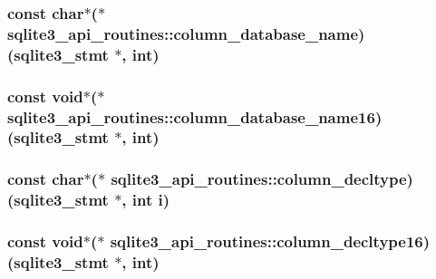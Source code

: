 \hypertarget{structsqlite3__api__routines_a585bc7d559987f0621d7cf2230165e96}{
\subsubsection[{column\-\_\-database\-\_\-name}]{\setlength{\rightskip}{0pt plus 5cm}const char$\ast$($\ast$ sqlite3\-\_\-api\-\_\-routines\-::column\-\_\-database\-\_\-name)({\bf sqlite3\-\_\-stmt} $\ast$, int)}}\label{structsqlite3__api__routines_a585bc7d559987f0621d7cf2230165e96}
\hypertarget{structsqlite3__api__routines_a707ef52cfe0e07ebddb86e078f9f0caf}{
\subsubsection[{column\-\_\-database\-\_\-name16}]{\setlength{\rightskip}{0pt plus 5cm}const void$\ast$($\ast$ sqlite3\-\_\-api\-\_\-routines\-::column\-\_\-database\-\_\-name16)({\bf sqlite3\-\_\-stmt} $\ast$, int)}}\label{structsqlite3__api__routines_a707ef52cfe0e07ebddb86e078f9f0caf}
\hypertarget{structsqlite3__api__routines_afca592a63d3a249ddb0a042416237a5a}{
\subsubsection[{column\-\_\-decltype}]{\setlength{\rightskip}{0pt plus 5cm}const char$\ast$($\ast$ sqlite3\-\_\-api\-\_\-routines\-::column\-\_\-decltype)({\bf sqlite3\-\_\-stmt} $\ast$, int i)}}\label{structsqlite3__api__routines_afca592a63d3a249ddb0a042416237a5a}
\hypertarget{structsqlite3__api__routines_a11d10f42586997006fd7ab07aaa365bf}{
\subsubsection[{column\-\_\-decltype16}]{\setlength{\rightskip}{0pt plus 5cm}const void$\ast$($\ast$ sqlite3\-\_\-api\-\_\-routines\-::column\-\_\-decltype16)({\bf sqlite3\-\_\-stmt} $\ast$, int)}}\label{structsqlite3__api__routines_a11d10f42586997006fd7ab07aaa365bf}
